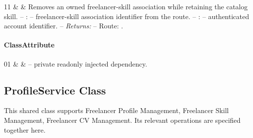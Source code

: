\begin{ClassMethodTable}
11 &  &
Removes an owned freelancer-skill association while retaining the catalog skill.
\newline -- :  -- freelancer-skill association identifier from the route.
\newline -- :  -- authenticated account identifier.
\newline -- \textit{Returns:} 
\newline -- Route: .
 \\ \hline

\end{ClassMethodTable}

\paragraph{ClassAttribute}
\begin{ClassAttributeTable}
01 &  &  -- private readonly injected dependency. \\ \hline
\end{ClassAttributeTable}

\subsection{ProfileService Class}
\label{cls:nhuy-ProfileService}

This shared class supports Freelancer Profile Management, Freelancer Skill Management, Freelancer CV Management. Its relevant operations are specified together here.

